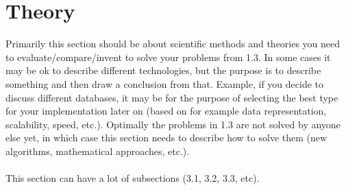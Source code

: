 \section{Theory}
Primarily this section should be about scientific methods and theories you need to evaluate/compare/invent to solve your problems from 1.3. In some cases it may be ok to describe different technologies, but the purpose is to describe something and then draw a conclusion from that. Example, if you decide to discuss different databases, it may be for the purpose of selecting the best type for your implementation later on (based on for example data representation, scalability, speed, etc.). Optimally the problems in 1.3 are not solved by anyone else yet, in which case this section needs to describe how to solve them (new algorithms, mathematical approaches, etc.).
 \\ \\
This section can have a lot of subsections (3.1, 3.2, 3.3, etc).
